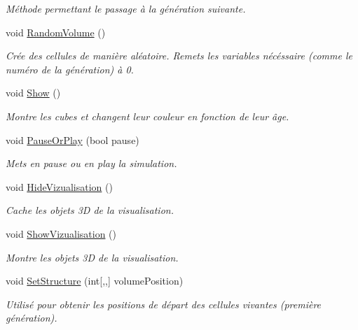 \begin{DoxyCompactItemize}
\begin{DoxyCompactList}\small\item\em Méthode permettant le passage à la génération suivante. \end{DoxyCompactList}\item 
void \mbox{\hyperlink{class_simulation_aff8ad1d9fe429a08bf0d42f52b08b71b}{Random\+Volume}} ()
\begin{DoxyCompactList}\small\item\em Crée des cellules de manière aléatoire. Remets les variables nécéssaire (comme le numéro de la génération) à 0. \end{DoxyCompactList}\item 
void \mbox{\hyperlink{class_simulation_af5fd57d6f657f07bc0fac7085832dc82}{Show}} ()
\begin{DoxyCompactList}\small\item\em Montre les cubes et changent leur couleur en fonction de leur âge. \end{DoxyCompactList}\item 
void \mbox{\hyperlink{class_simulation_ab668bfea667549d1295fc55f5ccfbc4a}{Pause\+Or\+Play}} (bool pause)
\begin{DoxyCompactList}\small\item\em Mets en pause ou en play la simulation. \end{DoxyCompactList}\item 
void \mbox{\hyperlink{class_simulation_a71a9e0a93e05353ff243f4c48afa67d0}{Hide\+Vizualisation}} ()
\begin{DoxyCompactList}\small\item\em Cache les objets 3D de la visualisation. \end{DoxyCompactList}\item 
void \mbox{\hyperlink{class_simulation_acc3c641f3874f1805c3a13d2153b6023}{Show\+Vizualisation}} ()
\begin{DoxyCompactList}\small\item\em Montre les objets 3D de la visualisation. \end{DoxyCompactList}\item 
void \mbox{\hyperlink{class_simulation_a775498931843884fbc6c08de3b2b1afd}{Set\+Structure}} (int\mbox{[},,\mbox{]} volume\+Position)
\begin{DoxyCompactList}\small\item\em Utilisé pour obtenir les positions de départ des cellules vivantes (première génération). \end{DoxyCompactList}\item 

\end{DoxyCompactItemize}

